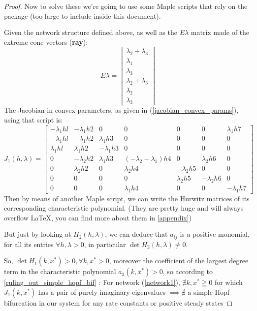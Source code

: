 \begin{proof}
	Now to solve these we're going to use some Maple scripts that rely on the \cite{franz2016ConvexMaple} package (too large to include inside this document).

	Given the network structure defined above, as well as the $E\lambda$ matrix made of the extreme cone vectors (\textbf{ray}):
	\[
		E\lambda =
		\begin{bmatrix}
			\lambda_2 + \lambda_3 \\
			\lambda_1 \\
			\lambda_3 \\
			\lambda_2 + \lambda_3 \\
			\lambda_2 \\
			\lambda_3
		\end{bmatrix}
	\]
	The Jacobian in convex parameters, as given in (\ref{jacobian_convex_params}), using that script is:
	\[
		\left. J_1(h,\lambda)=
		\left[
			\begin{array}{ccccccc}-\lambda_1hl&-\lambda_1h2&0&0&0&0&\lambda_1h7\\-\lambda_1hl&-\lambda_1h2&\lambda_1h3&0&0&0&0\\\lambda_1hl&\lambda_1h2&-\lambda_1h3&0&0&0&0\\0&-\lambda_2h2&\lambda_1h3&(-\lambda_2-\lambda_1)h4&0&\lambda_2h6&0\\0&\lambda_2h2&0&\lambda_2h4&-\lambda_2h5&0&0\\0&0&0&0&\lambda_2h5&-\lambda_2h6&0\\0&0&0&\lambda_1h4&0&0&-\lambda_1h7
		\end{array}\right.\right]
	\]
	Then by means of another Maple script, we can write the Hurwitz matrices of its corresponding characteristic polynomial. (They are pretty huge and will always overflow \LaTeX, you can find more about them in \ref{appendix})

	But just by looking at $H_2(h,\lambda)$, we can deduce that $a_{ij}$ is a positive monomial, for all  its entries $\forall h , \lambda > 0$, in particular $\det H_2(h, \lambda) \neq 0$.

	So, $\det H_1(k,x^*) > 0, \forall k, x^* > 0$, moreover the coefficient of the largest degree term in the characteristic polynomial $a_3(k, x^*) > 0$, so according to \ref{ruling_out_simple_hopf_bif} : For network (\ref{network1}), $\nexists k, x^* \geqq 0$ for which $J_1(k,x^*)$ has a pair of purely imaginary eigenvalues $\implies \nexists$ a simple Hopf bifurcation in our system for any rate constants or positive steady states
\end{proof}

